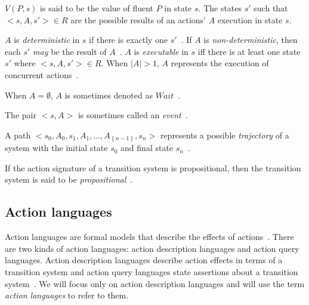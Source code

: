 $ V(P,s) $ is said to be the value of fluent $ P $ in state $ s $.
The states $ s' $ such that $ <s, A, s'> \in R $ are the possible results of an actions' $ A $ execution in state $ s $.

\begin{definition}
    $ A $ is \textit{deterministic} in $ s $ if there is exactly one $ s' $~\citep{gelfond_action_1998}.
    If $ A $ is \textit{non-deterministic}, then each $ s' $ \textit{may} be the result of $ A $~\citep{blount_architecture_2013}.
    $ A $ is \textit{executable} in $ s $ iff there is at least one state $ s' $ where $ <s, A, s'> \in R $.
    When $ \left|A\right|>1 $, $A$ represents the execution of concurrent actions~\citep{gelfond_action_1998, blount_architecture_2013}.
\end{definition}

\begin{definition}
    When $A = \emptyset$, $A$ is sometimes denoted as $Wait$~\citep{gelfond_action_1998}.
\end{definition}

\begin{definition}
    The pair $<s, A>$ is sometimes called an \textit{event}~\citep{gelfond_authorization_2008}.
\end{definition}

\begin{definition}
    A path $ <s_0, A_0, s_1, A_1, \dots, A_{\left\{n-1\right\}}, s_n> $ represents a possible \textit{trajectory} of a system with the initial state $ s_0 $ and final state $ s_n $~\citep{blount_architecture_2013}.
\end{definition}

\begin{definition}
    If the action signature of a transition system is propositional, then the transition system is said to be \textit{propositional}~\citep{gelfond_action_1998}.
\end{definition}

\subsection{Action languages}
\label{subsec:action_languages}

Action languages are formal models that describe the effects of actions~\citep{gelfond_action_1998}.
There are two kinds of action languages: action description languages and action query languages.
Action description languages describe action effects in terms of a transition system and action query languages state assertions about a transition system~\citep{gelfond_action_1998}.
We will focus only on action description languages and will use the term \textit{action languages} to refer to them.

